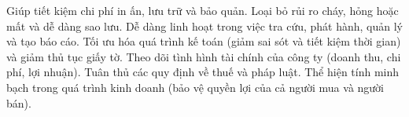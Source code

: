 Giúp tiết kiệm chi phí in ấn, lưu trữ và bảo quản.
Loại bỏ rủi ro cháy, hỏng hoặc mất và dễ dàng sao lưu.
Dễ dàng linh hoạt trong việc tra cứu, phát hành, quản lý và tạo báo cáo.
Tối ưu hóa quá trình kế toán (giảm sai sót và tiết kiệm thời gian) và giảm thủ tục giấy tờ.
Theo dõi tình hình tài chính của công ty (doanh thu, chi phí, lợi nhuận).
Tuân thủ các quy định về thuế và pháp luật.
Thể hiện tính minh bạch trong quá trình kinh doanh (bảo vệ quyền lợi của cả người mua và người bán).